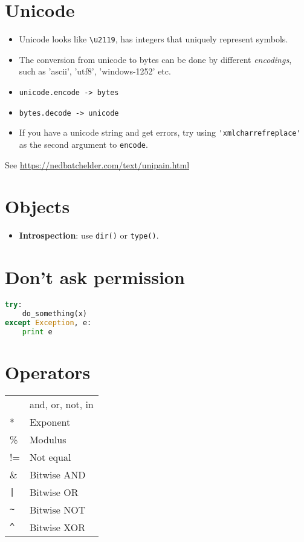 \documentclass[11pt]{article}
\begin{document}
\begin{multicols*}{3}
\section{Unicode}
\begin{itemize}[wide = 4pt, labelindent=\parindent]
\item Unicode looks like \verb+\u2119+, has integers that uniquely represent symbols.
\item The conversion from unicode to bytes can be done by different \textit{encodings}, such as 'ascii', 'utf8', 'windows-1252' etc. 
\item \verb+unicode.encode -> bytes+
\item \verb+bytes.decode -> unicode+
\item If you have a unicode string and get errors, try using \verb+'xmlcharrefreplace'+ as the second argument to \verb+encode+. 
\end{itemize}

See \url{https://nedbatchelder.com/text/unipain.html}

\section{Objects}
\begin{itemize}
\item \textbf{Introspection}: use \verb+dir()+ or \verb+type()+.
\end{itemize}

\section{Don't ask permission}
\begin{lstlisting}[language=Python,linewidth=0.95\linewidth]
try:
    do_something(x)
except Exception, e:
    print e
\end{lstlisting}

\section{Operators}
\begin{tabular}{>{\ttfamily \large}l>{\ttfamily}l}
  \hline
  \multicolumn{1}{l}{Operator} & \multicolumn{1}{l}{Meaning} \\
\hline
& and, or, not, in \\
** &  Exponent \\
\%  &  Modulus  \\
!= &  Not equal  \\
\&  &  Bitwise AND  \\	
\verb+|+  &  Bitwise OR  \\	
\verb+~+  &  Bitwise NOT  \\	
\verb+^+  &  Bitwise XOR  \\
\hline
\end{tabular}  
  

\end{multicols*}
\end{document}
